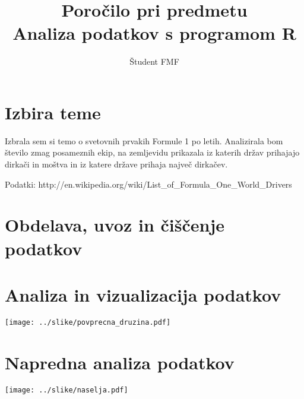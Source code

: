 \documentclass[11pt,a4paper]{article}
\begin{document}
\title{Poročilo pri predmetu \\
Analiza podatkov s programom R}
\author{Študent FMF}
\maketitle

\section{Izbira teme}

Izbrala sem si temo o svetovnih prvakih Formule 1 po letih. Analizirala bom število zmag posameznih ekip, na zemljevidu prikazala iz katerih držav prihajajo dirkači in moštva in iz katere države prihaja največ dirkačev. 

Podatki: http://en.wikipedia.org/wiki/List_of_Formula_One_World_Drivers%

\section{Obdelava, uvoz in čiščenje podatkov}

\section{Analiza in vizualizacija podatkov}

\texttt{[image: ../slike/povprecna\_druzina.pdf]}

\section{Napredna analiza podatkov}

\texttt{[image: ../slike/naselja.pdf]}
\end{document}
